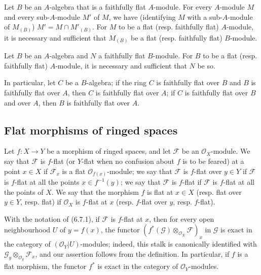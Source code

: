 \begin{env}[6.6.3]
\label{0.6.6.3}
Let $B$ be an $A$-algebra that is a faithfully flat $A$-module. For every
$A$-module $M$ and every sub-$A$-module $M'$ of $M$, we have (identifying $M$
with a sub-$A$-module of $M_{(B)}$) $M'=M\cap M'_{(B)}$. For $M$ to be a
flat (resp. faithfully flat) $A$-module, it is necessary and sufficient that $M_{(B)}$
be a flat (resp. faithfully flat) $B$-module.
\end{env}

\begin{env}[6.6.4]
\label{0.6.6.4}
Let $B$ be an $A$-algebra and $N$ a faithfully flat $B$-module. For $B$
to be a flat (resp. faithfully flat) $A$-module, it is necessary and sufficient that $N$
be so.

In particular, let $C$ be a $B$-algebra; if the ring $C$ is faithfully
flat over $B$ and $B$ is faithfully flat over $A$, then $C$ is faithfully flat
over $A$; if $C$ is faithfully flat over $B$ and over $A$, then $B$ is
faithfully flat over $A$.
\end{env}

\subsection{Flat morphisms of ringed spaces}
\label{subsection:0.6.7}

\begin{env}[6.7.1]
\label{0.6.7.1}
Let $f:X\to Y$ be a morphism of ringed spaces, and let $\mathcal F$ be an
$\mathcal O_X$-module. We say that $\mathcal F$ is $f$-flat (or $Y$-flat
when no confusion about $f$ is to be feared) at a point $x\in X$ if
$\mathcal F_x$ is a flat $\mathcal O_{f(x)}$-module; we say that
$\mathcal F$ is $f$-flat over $y\in Y$ if $\mathcal F$ is $f$-flat
at all the points $x\in f^{-1}(y)$; we say that $\mathcal F$ is $f$-flat
if $\mathcal F$ is $f$-flat at all the points of $X$. We say that the
morphism $f$ is flat at $x\in X$ (resp. flat over $y\in Y$, resp.
flat) if $\mathcal O_X$ is $f$-flat at $x$ (resp. $f$-flat over $y$,
resp. $f$-flat).
\end{env}

\begin{env}[6.7.2]
\label{0.6.7.2}
With the notation of (6.7.1), if $\mathcal F$ is $f$-flat at $x$, then for every
open neighbourhood $U$ of $y=f(x)$, the functor
$(f^*(\mathcal G)\otimes_{\mathcal O_X}\mathcal F)_x$ in $\mathcal G$ is
exact in the category of $(\mathcal O_Y|U)$-modules; indeed, this
stalk is canonically identified with
$\mathcal G_y\otimes_{\mathcal O_y}\mathcal F_x$, and our assertion follows
from the definition. In particular, if $f$ is a flat morphism, the functor
$f^*$ is exact in the category of $\mathcal O_Y$-modules.
\end{env}

